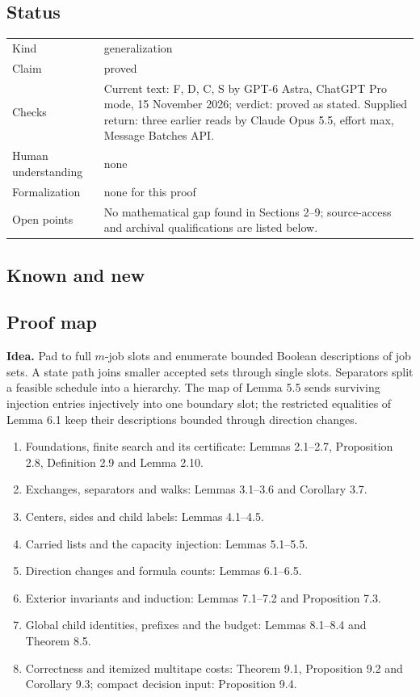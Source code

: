 \documentclass[11pt,a4paper]{article}
\theoremstyle{plain}
\theoremstyle{definition}
\begin{document}
\subsection{Status}
\noindent\begin{tabularx}{\linewidth}{@{}L{3.0cm}Y@{}}
\toprule
Kind & generalization\\
Claim & proved\\
Checks & Current text: F, D, C, S by GPT-6 Astra, ChatGPT Pro mode, 15 November 2026; verdict: proved as stated. Supplied return: three earlier reads by Claude Opus 5.5, effort max, Message Batches API.\\
Human understanding & none\\
Formalization & none for this proof\\
Open points & No mathematical gap found in Sections 2--9; source-access and archival qualifications are listed below.\\
\bottomrule
\end{tabularx}

\subsection{Known and new}

\subsection{Proof map}

\noindent\textbf{Idea.} Pad to full $m$-job slots and enumerate bounded Boolean descriptions of job sets. A state path joins smaller accepted sets through single slots. Separators split a feasible schedule into a hierarchy. The map of Lemma 5.5 sends surviving injection entries injectively into one boundary slot; the restricted equalities of Lemma 6.1 keep their descriptions bounded through direction changes.

\begin{enumerate}[nosep]
\item Foundations, finite search and its certificate: Lemmas 2.1--2.7, Proposition 2.8, Definition 2.9 and Lemma 2.10.
\item Exchanges, separators and walks: Lemmas 3.1--3.6 and Corollary 3.7.
\item Centers, sides and child labels: Lemmas 4.1--4.5.
\item Carried lists and the capacity injection: Lemmas 5.1--5.5.
\item Direction changes and formula counts: Lemmas 6.1--6.5.
\item Exterior invariants and induction: Lemmas 7.1--7.2 and Proposition 7.3.
\item Global child identities, prefixes and the budget: Lemmas 8.1--8.4 and Theorem 8.5.
\item Correctness and itemized multitape costs: Theorem 9.1, Proposition 9.2 and Corollary 9.3; compact decision input: Proposition 9.4.
\end{enumerate}
\end{document}
